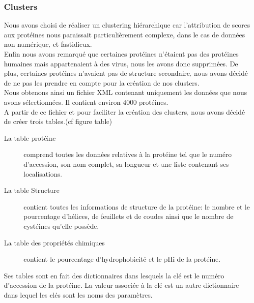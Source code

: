 \subsubsection*{Clusters}
Nous avons choisi de réaliser un clustering hiérarchique car l'attribution de scores aux protéines nous paraissait particulièrement complexe, dans le cas de données non numérique, et fastidieux.\\

Enfin nous avons remarqué que certaines protéines n'étaient pas des protéines humaines mais appartenaient à des virus, nous les avons donc supprimées. De plus, certaines protéines n'avaient pas de structure secondaire, nous avons décidé de ne pas les prendre en compte pour la création de nos clusters.\\
\newline
Nous obtenons ainsi un fichier XML contenant uniquement les données que nous avons sélectionnées. Il contient environ 4000 protéines.\\

A partir de ce fichier et pour faciliter la création des clusters, nous avons décidé de créer trois tables.(cf figure table)
\begin{description}
\item[La table protéine] comprend toutes les données relatives à la protéine tel que le numéro d'accession, son nom complet, sa longueur et une liste contenant ses localisations.
\item[La table Structure] contient toutes les informations de structure de la protéine: le nombre et le pourcentage d'hélices, de feuillets et de coudes ainsi que le nombre de cystéines qu'elle possède.
\item[La table des propriétés chimiques] contient le pourcentage d'hydrophobicité et le pHi de la protéine.
\end{description}
Ses tables sont en fait des dictionnaires dans lesquels la clé est le numéro d'accession de la protéine. La valeur associée à la clé est un autre dictionnaire dans lequel les clés sont les noms des paramètres.

